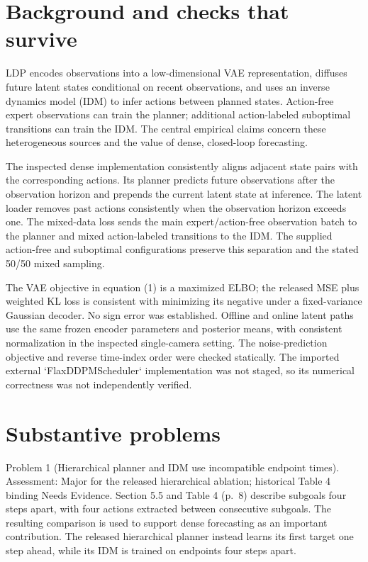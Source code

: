 \documentclass[10pt]{article}
\begin{document}
\section*{Background and checks that survive}
LDP encodes observations into a low-dimensional VAE representation, diffuses future latent states conditional on recent observations, and uses an inverse dynamics model (IDM) to infer actions between planned states. Action-free expert observations can train the planner; additional action-labeled suboptimal transitions can train the IDM. The central empirical claims concern these heterogeneous sources and the value of dense, closed-loop forecasting.\par
The inspected dense implementation consistently aligns adjacent state pairs with the corresponding actions. Its planner predicts future observations after the observation horizon and prepends the current latent state at inference. The latent loader removes past actions consistently when the observation horizon exceeds one. The mixed-data loss sends the main expert/action-free observation batch to the planner and mixed action-labeled transitions to the IDM. The supplied action-free and suboptimal configurations preserve this separation and the stated 50/50 mixed sampling.\par
The VAE objective in equation (1) is a maximized ELBO; the released MSE plus weighted KL loss is consistent with minimizing its negative under a fixed-variance Gaussian decoder. No sign error was established. Offline and online latent paths use the same frozen encoder parameters and posterior means, with consistent normalization in the inspected single-camera setting. The noise-prediction objective and reverse time-index order were checked statically. The imported external `FlaxDDPMScheduler` implementation was not staged, so its numerical correctness was not independently verified.\par
\section*{Substantive problems}
Problem 1 (Hierarchical planner and IDM use incompatible endpoint times).  Assessment: Major for the released hierarchical ablation; historical Table 4 binding Needs Evidence. Section 5.5 and Table 4 (p. 8) describe subgoals four steps apart, with four actions extracted between consecutive subgoals. The resulting comparison is used to support dense forecasting as an important contribution. The released hierarchical planner instead learns its first target one step ahead, while its IDM is trained on endpoints four steps apart.\par
\end{document}
